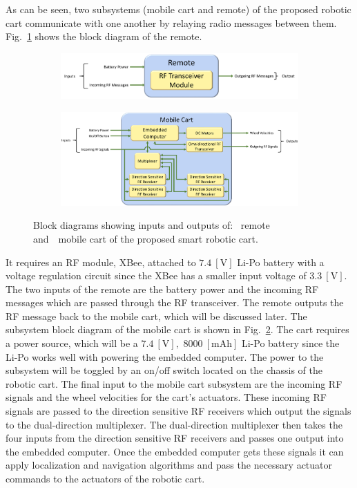\documentclass[conference]{IEEEtran}
\begin{document}
As can be seen, two subsystems (mobile cart and remote) of the proposed robotic cart communicate with one another by relaying radio messages between them. Fig.~\ref{fig:remote_block_diag} shows the block diagram of the remote. %
%
\begin{figure}[htbp]
  \begin{subfigure}[b]{0.9\linewidth}
    \centering
    \includegraphics[width=\textwidth]{figs/remoteBlockDiagram.pdf}
    \caption{}
    \label{fig:remote_block_diag}
  \end{subfigure}
  \begin{subfigure}[b]{0.9\linewidth}
    \centering
    \includegraphics[width=\textwidth]{figs/mobileCartBlockDiagram.pdf}
    \caption{}
    \label{fig:mobile_block_diag}
  \end{subfigure}
  \caption{Block diagrams showing inputs and outputs of:~ remote and~~mobile cart of the proposed smart robotic cart.}
  \label{fig:blockDiagramRemoteMobileCart}
\end{figure}
%
It requires an RF module, XBee, attached to $7.4~[\si{\volt}]$ Li-Po battery
with a voltage regulation circuit since the XBee has a smaller input voltage of
$3.3~[\si{\volt}].$ The two inputs of the remote are the battery power and the
incoming RF messages which are passed through the RF transceiver. The remote
outputs the RF message back to the mobile cart, which will be discussed
later. The subsystem block diagram of the mobile cart is shown in
Fig.~\ref{fig:mobile_block_diag}. The cart requires a power source, which will
be a $7.4~[\si{\volt}],$ $8000~[\si{\milli\ampere\hour}]$ Li-Po battery since the Li-Po works well with powering the
embedded computer. The power to the subsystem will be toggled
by an on/off switch located on the chassis of the robotic cart. The final input
to the mobile cart subsystem are the incoming RF signals and the wheel velocities for the cart's actuators. These incoming RF
signals are passed to the direction sensitive RF receivers which output the
signals to the dual-direction multiplexer. The dual-direction multiplexer then
takes the four inputs from the direction sensitive RF receivers and passes one
output into the embedded computer. Once the embedded computer gets these signals
it can apply localization and navigation algorithms and pass the necessary actuator commands to the actuators of the robotic cart. 
\end{document}
